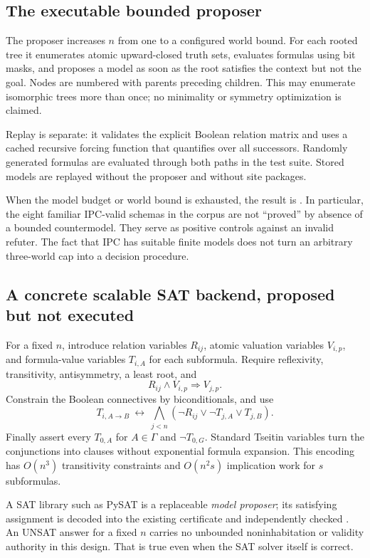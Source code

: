 \subsection{The executable bounded proposer}
The proposer increases $n$ from one to a configured world bound. For each
rooted tree it enumerates atomic upward-closed truth sets, evaluates formulas
using bit masks, and proposes a model as soon as the root satisfies the context
but not the goal. Nodes are numbered with parents preceding children. This
may enumerate isomorphic trees more than once; no minimality or symmetry
optimization is claimed.

Replay is separate: it validates the explicit Boolean relation matrix and uses
a cached recursive forcing function that quantifies over all successors.
Randomly generated formulas are evaluated through both paths in the test
suite. Stored models are replayed without the proposer and without site
packages.

When the model budget or world bound is exhausted, the result is \unknown{}.
In particular, the eight familiar IPC-valid schemas in the corpus are not
``proved'' by absence of a bounded countermodel. They serve as positive controls
against an invalid refuter. The fact that IPC has suitable finite models does
not turn an arbitrary three-world cap into a decision procedure.

\subsection{A concrete scalable SAT backend, proposed but not executed}
For a fixed $n$, introduce relation variables $R_{ij}$, atomic valuation
variables $V_{i,p}$, and formula-value variables $T_{i,A}$ for each subformula.
Require reflexivity, transitivity, antisymmetry, a least root, and
\[
 R_{ij}\land V_{i,p}\Longrightarrow V_{j,p}.
\]
Constrain the Boolean connectives by biconditionals, and use
\[
 T_{i,A\to B}\ \longleftrightarrow\
 \bigwedge_{j<n}(\neg R_{ij}\lor\neg T_{j,A}\lor T_{j,B}).
\]
Finally assert every $T_{0,A}$ for $A\in\Gamma$ and $\neg T_{0,G}$. Standard
Tseitin variables turn the conjunctions into clauses without exponential
formula expansion. This encoding has $O(n^3)$ transitivity constraints and
$O(n^2s)$ implication work for $s$ subformulas.

A SAT library such as PySAT is a replaceable \emph{model proposer}; its
satisfying assignment is decoded into the existing certificate and independently
checked \cite{pysat}. An UNSAT answer for a fixed $n$ carries no unbounded
noninhabitation or validity authority in this design. That is true even when
the SAT solver itself is correct.
